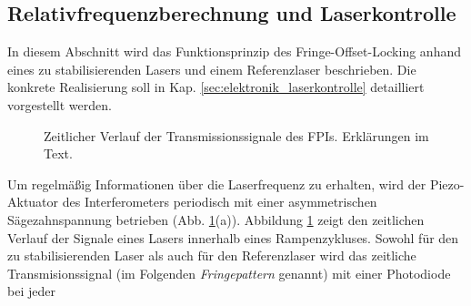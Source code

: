 \subsection{Relativfrequenzberechnung
und Laserkontrolle}\label{subsec:relativfrequenzberechnung_und_laserkontrolle}
In diesem Abschnitt wird das Funktionsprinzip des Fringe-Offset-Locking anhand
eines zu stabilisierenden Lasers und einem Referenzlaser beschrieben. Die
konkrete Realisierung soll in Kap. \ref{sec:elektronik_laserkontrolle}
detailliert vorgestellt werden.\par
\begin{figure}[h]
 	\centering
	\caption[Zeitlicher Verlauf
	FPI-Transmission]{Zeitlicher Verlauf der
	Transmissionssignale des FPIs. Erklärungen im Text.}\label{fig:FPI_signal-zeitverlauf}
\end{figure}
Um regelmäßig Informationen über die Laserfrequenz zu erhalten, wird der
Piezo-Aktuator des Interferometers periodisch mit einer asymmetrischen
Sägezahnspannung betrieben (Abb. \ref{fig:FPI_signal-zeitverlauf}(a)). Abbildung
\ref{fig:FPI_signal-zeitverlauf} zeigt den zeitlichen Verlauf der Signale eines
Lasers innerhalb eines Rampenzykluses. Sowohl für den zu stabilisierenden
Laser als auch für den Referenzlaser wird das zeitliche Transmisionssignal (im
Folgenden \textit{Fringepattern} genannt) mit einer Photodiode bei jeder
